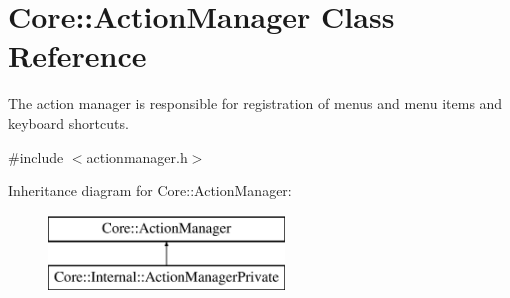\hypertarget{class_core_1_1_action_manager}{\section{\-Core\-:\-:\-Action\-Manager \-Class \-Reference}
\label{class_core_1_1_action_manager}
}


\-The action manager is responsible for registration of menus and menu items and keyboard shortcuts.  




{\ttfamily \#include $<$actionmanager.\-h$>$}

\-Inheritance diagram for \-Core\-:\-:\-Action\-Manager\-:\begin{figure}[H]
\begin{center}
\leavevmode
\includegraphics[height=2.000000cm]{class_core_1_1_action_manager}
\end{center}
\end{figure}

